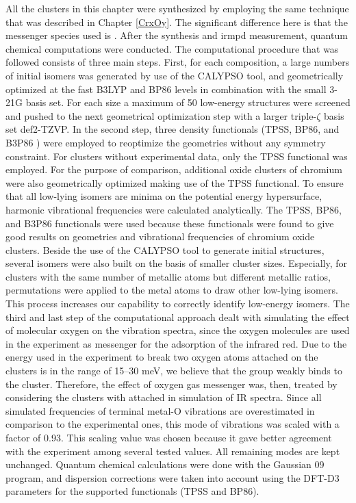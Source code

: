 \begin{refsection}
All the clusters in this chapter were synthesized by employing the same technique that was described in Chapter \ref{CrxOy}. The significant difference here is that the messenger species used is . After the synthesis and \acrshort{irmpd} measurement, quantum chemical computations were conducted. The computational procedure that was followed consists of three main steps. First, for each composition, a large numbers of initial isomers was generated by use of the CALYPSO tool, \cite{CALYPSO} and geometrically optimized at the fast B3LYP \cite{lyp,b3lyp2,b3} and BP86 \cite{b3lyp2,p86} levels in combination with the small 3-21G basis set. \cite{3-21G-2nd, 3-21G-tran} For each size a maximum of 50 low-energy structures were screened and pushed to the next geometrical optimization step with a larger triple-$\zeta$ basis set def2-TZVP. \cite{def2} In the second step, three density functionals (TPSS, \cite{tpss} BP86, \cite{b3lyp2,p86} and B3P86 \cite{b3,p86}) were employed to reoptimize the geometries without any symmetry constraint. For clusters without experimental data, only the TPSS functional was employed. For the purpose of comparison, additional oxide clusters of chromium were also geometrically optimized making use of the TPSS functional.\cite{tpss} To ensure that all low-lying isomers are minima on the potential energy hypersurface, harmonic vibrational frequencies were calculated analytically. The TPSS, BP86, and B3P86 functionals were used because these functionals were found to give good results on geometries and vibrational frequencies of chromium oxide clusters. \cite{Nhan18} Beside the use of the CALYPSO tool to generate initial structures, several isomers were also built on the basis of smaller cluster sizes. Especially, for clusters with the same number of metallic atoms but different metallic ratios, permutations were applied to the metal atoms to draw other low-lying isomers. This process increases our capability to correctly identify low-energy isomers. The third and last step of the computational approach dealt with simulating the effect of molecular oxygen on the vibration spectra, since the oxygen molecules are used in the experiment as messenger for the adsorption of the infrared red. Due to the energy used in the experiment to break two oxygen atoms attached on the clusters is in the range of 15--30 meV, we believe that the  group weakly binds to the cluster. Therefore, the effect of oxygen gas messenger was, then, treated by considering the clusters  with attached  in simulation of IR spectra. Since all simulated frequencies of terminal metal-O vibrations are overestimated in comparison to the experimental ones, this mode of vibrations was scaled with a factor of 0.93. This scaling value was chosen because it gave better agreement with the experiment among several tested values. All remaining modes are kept unchanged. Quantum chemical calculations were done with the Gaussian 09 program, \cite{g09} and dispersion corrections were taken into account using the DFT-D3 parameters \cite{GD3} for the supported functionals (TPSS and BP86).   





\end{refsection}
